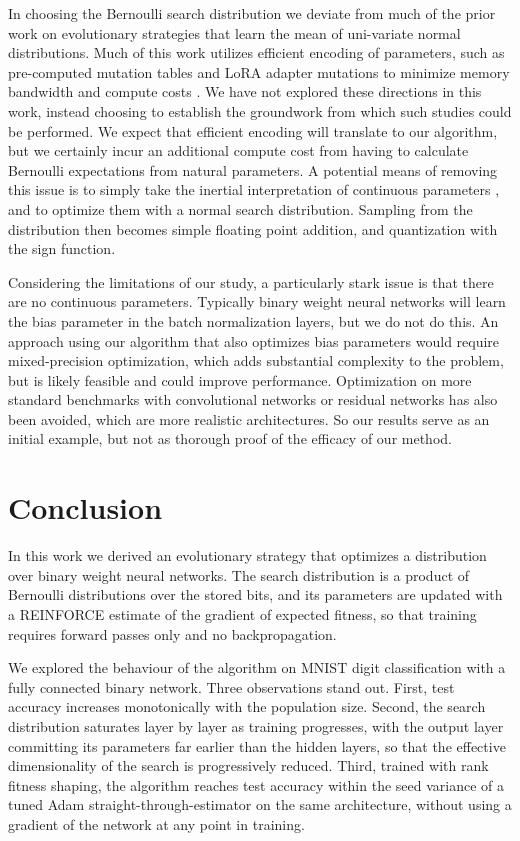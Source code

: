 \documentclass[runningheads]{llncs}
\begin{document}
In choosing the Bernoulli search distribution we deviate from much of the prior work on evolutionary strategies that learn the mean of uni-variate normal distributions. Much of this work utilizes efficient encoding of parameters, such as pre-computed mutation tables and LoRA adapter mutations to minimize memory bandwidth and compute costs \cite{sarkar2025eggroll}. We have not explored these directions in this work, instead choosing to establish the groundwork from which such studies could be performed. We expect that efficient encoding will translate to our algorithm, but we certainly incur an additional compute cost from having to calculate Bernoulli expectations from natural parameters. A potential means of removing this issue is to simply take the inertial interpretation of continuous parameters \cite{helwegen2019latent}, and to optimize them with a normal search distribution. Sampling from the distribution then becomes simple floating point addition, and quantization with the sign function.

Considering the limitations of our study, a particularly stark issue is that there are no continuous parameters. Typically binary weight neural networks will learn the bias parameter in the batch normalization layers, but we do not do this. An approach using our algorithm that also optimizes bias parameters would require mixed-precision optimization, which adds substantial complexity to the problem, but is likely feasible and could improve performance. Optimization on more standard benchmarks with convolutional networks or residual networks has also been avoided, which are more realistic architectures. So our results serve as an initial example, but not as thorough proof of the efficacy of our method.

\section{Conclusion}
\label{sec:conclusion}

In this work we derived an evolutionary strategy that optimizes a
distribution over binary weight neural networks. The search distribution
is a product of Bernoulli distributions over the stored bits, and its
parameters are updated with a REINFORCE estimate of the gradient of
expected fitness, so that training requires forward passes only and no
backpropagation.

We explored the behaviour of the algorithm on MNIST digit classification
with a fully connected binary network. Three observations stand out.
First, test accuracy increases monotonically with the population size. Second, the search distribution saturates
layer by layer as training progresses, with the output layer committing
its parameters far earlier than the hidden layers, so that the effective
dimensionality of the search is progressively reduced. Third, trained
with rank fitness shaping, the algorithm reaches test accuracy within
the seed variance of a tuned Adam straight-through-estimator on the same
architecture, without using a gradient of the network at any point in
training.
\end{document}
